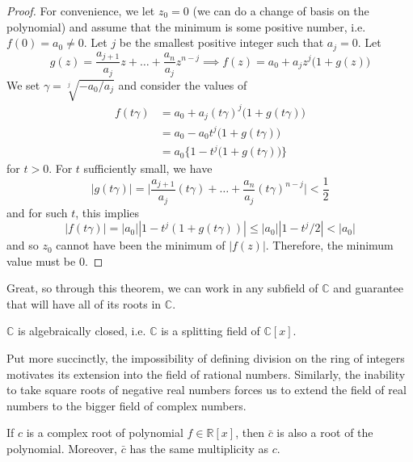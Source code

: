 \begin{proof}
    For convenience, we let $z_0 = 0$ (we can do a change of basis on the polynomial) and assume that the minimum is some positive number, i.e. $f(0) = a_0 \neq 0$. Let $j$ be the smallest positive integer such that $a_j = 0$. Let 
    \begin{equation}
      g(z) = \frac{a_{j+1}}{a_j} z + \ldots + \frac{a_n}{a_j} z^{n-j} \implies f(z) = a_0 + a_j z^j \big( 1 + g(z) \big) 
    \end{equation}
    We set $\gamma = \sqrt[j]{-a_0/a_j}$ and consider the values of 
    \begin{align}
      f(t \gamma) & = a_0 + a_j (t\gamma)^j \big( 1 + g(t\gamma) \big) \\
                  & = a_0 - a_0 t^j \big(1 + g(t \gamma) \big) \\
                  & = a_0 \big\{ 1 - t^j \big(1 + g(t \gamma) \big) \big\}
    \end{align} 
    for $t > 0$. For $t$ sufficiently small, we have 
    \begin{equation}
      |g(t \gamma)| = \bigg| \frac{a_{j+1}}{a_j} (t \gamma) + \ldots + \frac{a_n}{a_j} (t \gamma)^{n-j} \bigg| < \frac{1}{2} 
    \end{equation}
    and for such $t$, this implies 
    \begin{equation}
      |f(t \gamma)| = |a_0| |1 - t^j (1 + g(t \gamma))| \leq |a_0| |1 - t^j/2| < |a_0|
    \end{equation}
    and so $z_0$ cannot have been the minimum of $|f(z)|$. Therefore, the minimum value must be $0$.  
  \end{proof}

  Great, so through this theorem, we can work in any subfield of $\mathbb{C}$ and guarantee that will have all of its roots in $\mathbb{C}$. 

  \begin{corollary}
    $\mathbb{C}$ is algebraically closed, i.e. $\mathbb{C}$ is a splitting field of $\mathbb{C}[x]$. 
  \end{corollary}

  Put more succinctly, the impossibility of defining division on the ring of integers motivates its extension into the field of rational numbers. Similarly, the inability to take square roots of negative real numbers forces us to extend the field of real numbers to the bigger field of complex numbers. 

  \begin{theorem}
    If $c$ is a complex root of polynomial $f \in \mathbb{R}[x]$, then $\bar{c}$ is also a root of the polynomial. Moreover, $\bar{c}$ has the same multiplicity as $c$. 
  \end{theorem}

